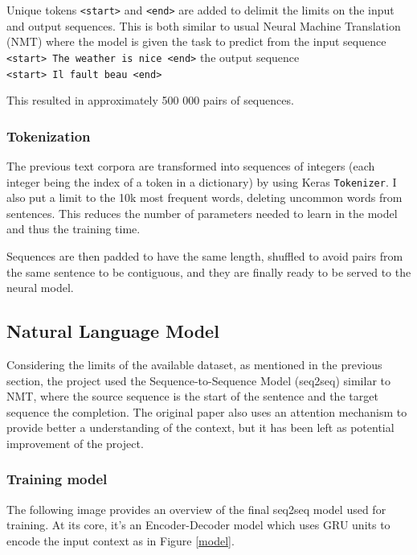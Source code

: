 \documentclass{article}
\begin{document}
Unique tokens \texttt{\textless{}start\textgreater{}} and \texttt{\textless{}end\textgreater{}} are added to delimit the limits on the input and output sequences. This is both similar to usual Neural Machine Translation (NMT) where the model is given the task to predict from the input sequence \texttt{\textless{}start\textgreater{}\ The\ weather\ is\ nice\ \textless{}end\textgreater{}} the output sequence \texttt{\textless{}start\textgreater{}\ Il\ fault\ beau\ \textless{}end\textgreater{}}

This resulted in approximately 500 000 pairs of sequences.

\subsubsection{Tokenization}

The previous text corpora are transformed into sequences of integers (each integer being the index of a token in a dictionary) by using Keras \texttt{Tokenizer}. I also put a limit to the 10k most frequent words, deleting uncommon words from sentences. This reduces the number of parameters needed to learn in the model and thus the training time.

Sequences are then padded to have the same length, shuffled to avoid pairs from the same sentence to be contiguous, and they are finally ready to be served to the neural model.


\subsection{Natural Language Model}\label{natural-language-model}

Considering the limits of the available dataset, as mentioned in the previous section, the project used the Sequence-to-Sequence Model (seq2seq) similar to NMT, where the source sequence is the start of the sentence and the target sequence the completion. The original paper also uses an attention mechanism to provide better a understanding of the context, but it has been left as potential improvement of the project.

\subsubsection{Training model}\label{training-model}

The following image provides an overview of the final seq2seq model used for training. At its core, it's an Encoder-Decoder model which uses GRU units to encode the input context as in Figure \ref{model}.
\end{document}

